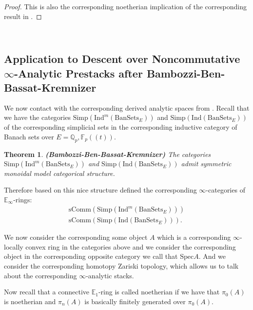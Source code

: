 \documentclass[12pt]{amsart}
\newtheorem{theorem}{Theorem}[section]
\theoremstyle{definition}
\numberwithin{equation}{section}
\begin{document}
\begin{proof}
This is also the corresponding noetherian implication of the corresponding result in \cite[Theorem 2.23]{TX2}.	
\end{proof}



\


\subsection{Application to Descent over Noncommutative $\infty$-Analytic Prestacks after Bambozzi-Ben-Bassat-Kremnizer}


\indent We now contact with the corresponding derived analytic spaces from \cite{BBBK}. Recall that we have the categories $\mathrm{Simp}(\mathrm{Ind}^m(\mathrm{BanSets}_{E}))$ and $\mathrm{Simp}(\mathrm{Ind}(\mathrm{BanSets}_{E}))$ of the corresponding simplicial sets in the corresponding inductive category of Banach sets over $E=\mathbb{Q}_p,\mathbb{F}_p((t))$.



\begin{theorem}\mbox{\bf{(Bambozzi-Ben-Bassat-Kremnizer)}}
The categories $\mathrm{Simp}(\mathrm{Ind}^m(\mathrm{BanSets}_{E}))$ and $\mathrm{Simp}(\mathrm{Ind}(\mathrm{BanSets}_{E}))$ admit symmetric monoidal model categorical structure.
	
\end{theorem}


\indent Therefore based on this nice structure \cite{BBBK} defined the corresponding $\infty$-categories of $\mathbb{E}_\infty$-rings:
\begin{align}
\mathrm{sComm}(\mathrm{Simp}(\mathrm{Ind}^m(\mathrm{BanSets}_{E})))\\
\mathrm{sComm}(\mathrm{Simp}(\mathrm{Ind}(\mathrm{BanSets}_{E}))).	
\end{align}

\indent We now consider the corresponding some object $A$ which is a corresponding $\infty$-locally convex ring in the categories above and we consider the corresponding object in the corresponding opposite category we call that $\mathrm{Spec}A$. And we consider the corresponding homotopy Zariski topology, which allows us to talk about the corresponding $\infty$-analytic stacks.


\indent Now recall that a connective $\mathbb{E}_1$-ring is called noetherian if we have that $\pi_0(A)$ is noetherian and $\pi_n(A)$ is basically finitely generated over $\pi_0(A)$.
\end{document}
